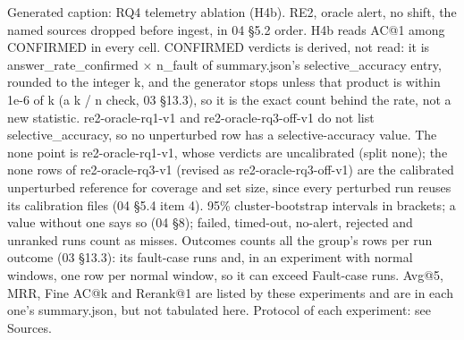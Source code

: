 \noindent Generated caption: RQ4 telemetry ablation (H4b). RE2, oracle alert, no shift, the named sources dropped before ingest, in 04 \S{}5.2 order. H4b reads AC@1 among CONFIRMED in every cell. CONFIRMED verdicts is derived, not read: it is answer\_rate\_confirmed $\times$ n\_fault of summary.json's selective\_accuracy entry, rounded to the integer k, and the generator stops unless that product is within 1e-6 of k (a k /\allowbreak{} n check, 03 \S{}13.3), so it is the exact count behind the rate, not a new statistic. re2-oracle-rq1-v1 and re2-oracle-rq3-off-v1 do not list selective\_accuracy, so no unperturbed row has a selective-accuracy value. The none point is re2-oracle-rq1-v1, whose verdicts are uncalibrated (split none); the none rows of re2-oracle-rq3-v1 (revised as re2-oracle-rq3-off-v1) are the calibrated unperturbed reference for coverage and set size, since every perturbed run reuses its calibration files (04 \S{}5.4 item 4). 95\% cluster-bootstrap intervals in brackets; a value without one says so (04 \S{}8); failed, timed-out, no-alert, rejected and unranked runs count as misses. Outcomes counts all the group's rows per run outcome (03 \S{}13.3): its fault-case runs and, in an experiment with normal windows, one row per normal window, so it can exceed Fault-case runs. Avg@5, MRR, Fine AC@k and Rerank@1 are listed by these experiments and are in each one's summary.json, but not tabulated here. Protocol of each experiment: see Sources.\par
\endgroup
